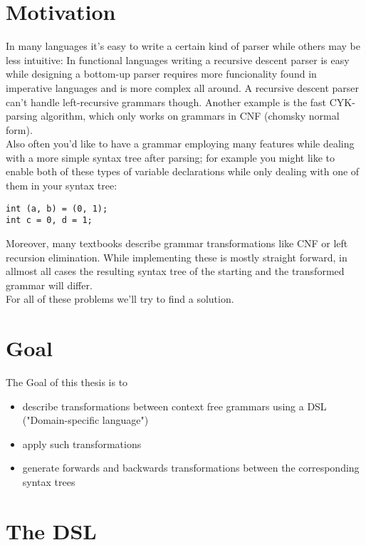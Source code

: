 \documentclass[a4paper]{article}
\begin{document}
\section*{Motivation}
In many languages it's easy to write a certain kind of parser while others may be less intuitive: In functional languages writing a recursive descent parser is easy while designing a bottom-up parser requires more funcionality found in imperative languages and is more complex all around. A recursive descent parser can't handle left-recursive grammars though. Another example is the fast CYK-parsing algorithm, which only works on grammars in CNF (chomsky normal form).\\
Also often you'd like to have a grammar employing many features while dealing with a more simple syntax tree after parsing; for example you might like to enable both of these types of variable declarations while only dealing with one of them in your syntax tree:
\begin{verbatim}
int (a, b) = (0, 1);
int c = 0, d = 1;
\end{verbatim}
Moreover, many textbooks describe grammar transformations like CNF or left recursion elimination. While implementing these is mostly straight forward, in allmost all cases the resulting syntax tree of the starting and the transformed grammar will differ.\\
For all of these problems we'll try to find a solution.

\section*{Goal}
The Goal of this thesis is to
\begin{itemize}
\item describe transformations between context free grammars using a DSL ("Domain-specific language")
\item apply such transformations
\item generate forwards and backwards transformations between the corresponding syntax trees
\end{itemize}

\section*{The DSL}
\end{document}
